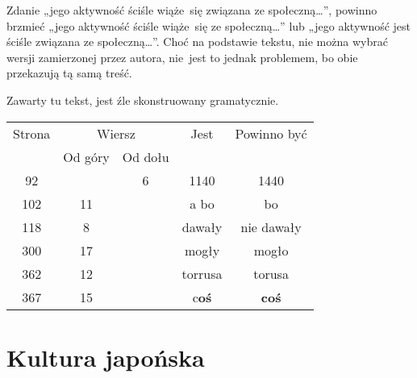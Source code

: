 \documentclass[a4paper,11pt]{article}
\begin{document}
\vspace{0em}


\noindent
{} Zdanie „jego aktywność ściśle wiąże~się
związana ze społeczną\ldots”, powinno brzmieć „jego aktywność ściśle
wiąże~się ze społeczną\ldots” lub „jego aktywność jest ściśle
związana ze społeczną\ldots”. Choć na podstawie tekstu, nie można
wybrać wersji zamierzonej przez autora, nie~jest to jednak problemem,
bo obie przekazują tą samą treść.

\vspace{\spaceFour}



\start {} Zawarty tu tekst, jest źle skonstruowany
gramatycznie.







\begin{center}

  \begin{tabular}{|c|c|c|c|c|}
    \hline
    Strona & \multicolumn{2}{c|}{Wiersz} & Jest
                              & Powinno być \\ \cline{2-3}
    & Od góry & Od dołu & & \\
    \hline
    92  & &  6 & 1140 & 1440 \\
    102 & 11 & & a bo & bo \\
    118 &  8 & & dawały & nie dawały \\
    300 & 17 & & mogły & mogło \\
    362 & 12 & & torrusa & torusa \\
    367 & 15 & & c\textbf{oś} & \textbf{coś} \\
    \hline
  \end{tabular}

\end{center}


\vspace{\spaceTwo}










\section{Kultura japońska}
\end{document}
